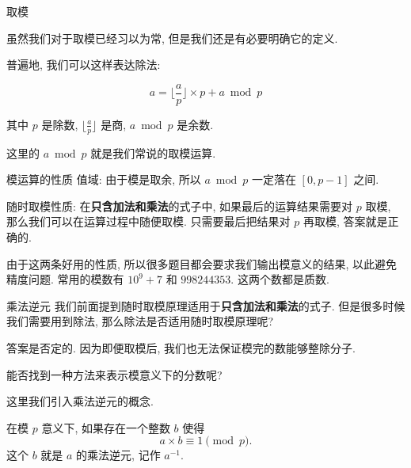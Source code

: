 \documentclass[aspectratio=169]{beamer}  %
\newcommand{\pau}{\pause}
\begin{document}
\begin{frame}{取模}

  虽然我们对于取模已经习以为常, 但是我们还是有必要明确它的定义.\pau

  \vspace{1em}

  普遍地, 我们可以这样表达除法: 

  $$a = \lfloor \frac{a}{p} \rfloor \times p + a \bmod p$$

  其中 $p$ 是除数, $\lfloor \frac{a}{p} \rfloor$ 是商, $a \bmod p$ 是余数.

  \vspace{1em}
  
  这里的 $a \bmod p$ 就是我们常说的取模运算.
\end{frame}

\begin{frame}{模运算的性质}  
  值域: 由于模是取余, 所以 $a \bmod p$ 一定落在 $[0,p-1]$ 之间.\pau

  \vspace{1em}

  随时取模性质: 在\textbf{只含加法和乘法}的式子中, 如果最后的运算结果需要对 $p$ 取模, 那么我们可以在运算过程中随便取模.
  只需要最后把结果对 $p$ 再取模, 答案就是正确的.\pau

  \vspace{1em}

  由于这两条好用的性质, 所以很多题目都会要求我们输出模意义的结果, 以此避免精度问题.
  常用的模数有 $10^9 + 7$ 和 $998244353$. 这两个数都是质数.\pau
\end{frame}

\begin{frame}{乘法逆元}
  我们前面提到随时取模原理适用于\textbf{只含加法和乘法}的式子.
  但是很多时候我们需要用到除法, 那么除法是否适用随时取模原理呢?\pau
  
  \vspace{1em}

  答案是否定的. 因为即便取模后, 我们也无法保证模完的数能够整除分子.\pau

  \vspace{1em}

  能否找到一种方法来表示模意义下的分数呢?\pau

  \vspace{1em}

  这里我们引入乘法逆元的概念. 
  
  \begin{definition}
    在模 $p$ 意义下, 如果存在一个整数 $b$ 使得
    $$a \times b \equiv 1 \pmod{p} \text{.}$$
    这个 $b$ 就是 $a$ 的乘法逆元, 记作 $a^{-1}$.
  \end{definition}
\end{frame}
\end{document}
